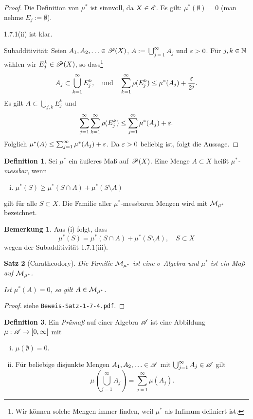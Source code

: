 \documentclass[
 a4paper,
 12pt,
 parskip=half
 ]{scrreprt}
\theoremstyle{plain}
\newtheorem{thm}{Satz}[section] %
\theoremstyle{definition}
\newtheorem{defn}[thm]{Definition}
\newtheorem*{rmrk*}{Bemerkung}
\numberwithin{equation}{section}
\begin{document}
\begin{proof}
 Die Definition von $\mu^*$ ist sinnvoll, da $X \in \mathscr{E}$. Es gilt: $\mu^*(\emptyset) = 0$ (man nehme $E_j := \emptyset$).
 
 1.7.1(ii) ist klar.
 
 Subadditivität: Seien $A_1, A_2, \ldots \in \mathscr{P}(X)$, $A:= \bigcup_{j=1}^\infty A_j$ und $\varepsilon > 0$. Für $j, k \in \mathbb{N}$ wählen wir $E_j^k \in \mathscr{P}(X)$, so dass\footnote{Wir können solche Mengen immer finden, weil $\mu^*$ als Infimum definiert ist.}
 \[ A_j \subset \bigcup_{k=1}^\infty E_j^k, \quad \text{und} \quad \sum_{k=1}^\infty \rho( E_j^k) \le \mu^* (A_j) + \frac{\varepsilon}{2^j}. \]
 Es gilt $A \subset \bigcup_{j,k} E_j^k$ und
 \[ \sum_{j=1}^\infty \sum_{k=1}^\infty \rho( E_j^k ) \le \sum_{j=1}^\infty \mu^*(A_j) + \varepsilon. \]
 Folglich $\mu^*(A) \le \sum_{j=1}^\infty \mu^*(A_j) + \varepsilon$. Da $\varepsilon > 0$ beliebig ist, folgt die Aussage.
\end{proof}

\begin{defn}
 Sei $\mu^*$ ein äußeres Maß auf $\mathscr{P}(X)$. Eine Menge $A \subset X$ heißt \emph{$\mu^*$-messbar}, wenn
 \begin{enumerate}[(i)]
  \item $\mu^*(S) \ge \mu^*( S \cap A ) + \mu^*( S \setminus A )$ 
 \end{enumerate}
 gilt für alle $S \subset X$. Die Familie aller $\mu^*$-messbaren Mengen wird mit $\mathcal{M}_{\mu^*}$ bezeichnet.
\end{defn}

\begin{rmrk*}
 Aus (i) folgt, dass
 \[ \mu^*(S) = \mu^* (S \cap A) + \mu^* ( S \setminus A ), \quad S \subset X \]
 wegen der Subadditivität 1.7.1(iii).
\end{rmrk*}

\begin{thm}[Caratheodory]
 Die Familie $\mathcal{M}_{\mu^*}$ ist eine $\sigma$-Algebra und $\mu^*$ ist ein Maß auf $\mathcal{M}_{\mu^*}$.
 
 Ist $\mu^*(A) = 0$, so gilt $A \in \mathcal{M}_{\mu^*}$.
\end{thm}

\begin{proof}
 siehe \verb+Beweis-Satz-1-7-4.pdf+.
\end{proof}

\begin{defn}
 Ein \emph{Prämaß} auf einer Algebra $\mathscr{A}$ ist eine Abbildung $\mu: \mathscr{A} \to [0, \infty]$ mit 
 \begin{enumerate}[(i)]
  \item $\mu(\emptyset) = 0$.
  \item Für beliebige disjunkte Mengen $A_1, A_2, \ldots \in \mathscr{A}$ mit $\bigcup_{j=1}^\infty A_j \in \mathscr{A}$ gilt
   \[ \mu \left( \bigcup_{j=1}^\infty A_j \right) = \sum_{j=1}^\infty \mu( A_j ). \]
 \end{enumerate}
\end{defn}
\end{document}
